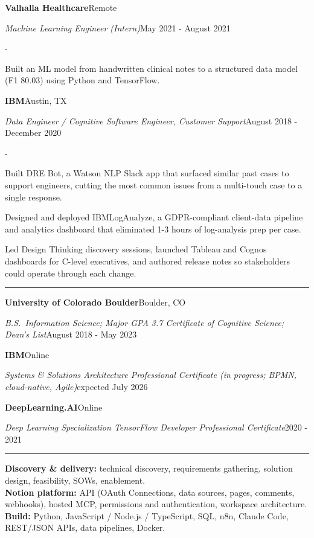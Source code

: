 \documentclass[10pt,letterpaper]{article}
\newenvironment{cvitems}{%
  \begin{list}{-}{%
    \setlength{\leftmargin}{12pt}%
    \setlength{\itemsep}{1.2pt}%
    \setlength{\parsep}{0pt}%
    \setlength{\topsep}{1.5pt}%
    \setlength{\partopsep}{0pt}%
    \setlength{\labelwidth}{6pt}%
    \setlength{\labelsep}{6pt}%
    \setlength{\itemindent}{0pt}%
  }%
}{\end{list}}
\newcommand{\cvsection}[1]{%
  \vspace{7pt}%
  \noindent{\bfseries\fontsize{11pt}{13pt}\selectfont\MakeUppercase{#1}}\par
  \vspace{1pt}%
  \noindent\rule{\textwidth}{0.4pt}\par
  \vspace{4pt}%
}
\newcommand{\cventryhead}[4]{%
  \noindent\textbf{#1}\hfill#2\par
  \vspace{0.5pt}%
  \noindent\textit{#3}\hfill#4\par
}
\newcommand{\cveduhead}[4]{%
  \noindent\textbf{#1}\hfill#2\par
  \vspace{0.5pt}%
  \noindent\textit{#3}\hfill#4\par
}
\begin{document}
\vspace{3pt}
\cventryhead{Valhalla Healthcare}{Remote}
{Machine Learning Engineer (Intern)}{May 2021 - August 2021}
\begin{cvitems}
  \item Built an ML model from handwritten clinical notes to a structured data model (F1 80.03) using Python and TensorFlow.
\end{cvitems}

\vspace{3pt}
\cventryhead{IBM}{Austin, TX}
{Data Engineer / Cognitive Software Engineer, Customer Support}{August 2018 - December 2020}
\begin{cvitems}
  \item Built DRE Bot, a Watson NLP Slack app that surfaced similar past cases to support engineers, cutting the most common issues from a multi-touch case to a single response.
  \item Designed and deployed IBMLogAnalyze, a GDPR-compliant client-data pipeline and analytics dashboard that eliminated 1-3 hours of log-analysis prep per case.
  \item Led Design Thinking discovery sessions, launched Tableau and Cognos dashboards for C-level executives, and authored release notes so stakeholders could operate through each change.
\end{cvitems}

\cvsection{Education}

\cveduhead{University of Colorado Boulder}{Boulder, CO}
{B.S.\ Information Science; Major GPA 3.7 \textbar{} Certificate of Cognitive Science; Dean's List}{August 2018 - May 2023}

\vspace{3pt}
\cveduhead{IBM}{Online}
{Systems \& Solutions Architecture Professional Certificate (in progress; BPMN, cloud-native, Agile)}{expected July 2026}

\vspace{3pt}
\cveduhead{DeepLearning.AI}{Online}
{Deep Learning Specialization \textbar{} TensorFlow Developer Professional Certificate}{2020 - 2021}

\cvsection{Skills}

{\raggedright
\noindent\textbf{Discovery \& delivery:} technical discovery, requirements gathering, solution design, feasibility, SOWs, enablement.\\[2pt]
\noindent\textbf{Notion platform:} API (OAuth Connections, data sources, pages, comments, webhooks), hosted MCP, permissions and authentication, workspace architecture.\\[2pt]
\noindent\textbf{Build:} Python, JavaScript / Node.js / TypeScript, SQL, n8n, Claude Code, REST/JSON APIs, data pipelines, Docker.\par
}
\end{document}
